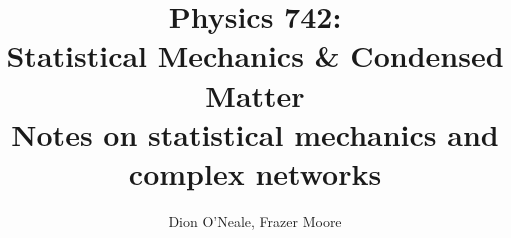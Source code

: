 \documentclass{article}
\begin{document}
\newcommand{\calG}{\mathcal{G}}
\title{Physics 742: \\
	Statistical Mechanics \& Condensed Matter\\
	Notes on statistical mechanics and complex networks}
\author{Dion O'Neale, Frazer Moore}
\maketitle
\newpage
\tableofcontents
\newpage








\end{document}
